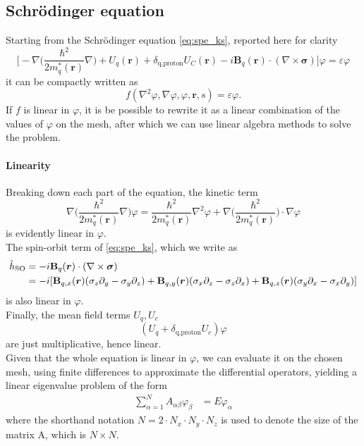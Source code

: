 \subsection{Schr\"odinger equation}
Starting from the Schr\"odinger equation \eqref{eq:spe_ks}, reported here for clarity
\begin{equation*}
    \bigg[-\nabla\bigg(\frac{\hbar^2}{2m^{*}_q(\mathbf r)}\nabla \bigg) + U_q(\mathbf r) + \delta_{\text{q,proton}}U_C(\mathbf r)-i\mathbf B_q(\mathbf r)\cdot(\nabla \times \boldsymbol\sigma) \bigg]\varphi=\varepsilon\varphi
\end{equation*}
it can be compactly written as
\begin{equation}
    \label{eq:pde} f(\nabla^2 \varphi, \nabla \varphi, \varphi, \bm r, s) = \varepsilon\varphi.
\end{equation}
If $f$ is linear in $\varphi$, it is be possible to rewrite it as a linear combination of the values of $\varphi$ on the mesh, after which we can use linear algebra methods to solve the problem.
\paragraph{Linearity}
Breaking down each part of the equation, the kinetic term
\begin{equation}
\label{eq:kin_lin_dim}
\nabla\bigg(\frac{\hbar^2}{2m^{*}_q(\mathbf r)}\nabla \bigg)\varphi = \frac{\hbar^2}{2m^{*}_q(\mathbf r)} \nabla^2\varphi + \nabla\bigg(\frac{\hbar^2}{2m^{*}_q(\mathbf r)}\bigg)\cdot \nabla\varphi
\end{equation}
is evidently linear in $\varphi$. 
\\The spin-orbit term of \eqref{eq:spe_ks}, which we write as
\begin{align*}
    \hat {{h}}_{\text{SO}}&=-i\mathbf B_q (\bm r )\cdot (\nabla \times \boldsymbol{\sigma} ) 
    \\&=-i[\mathbf B_{q,x}(\bm r)(\sigma_z\partial_y - \sigma_y\partial_z) + \mathbf B_{q,y}(\bm r)(\sigma_x\partial_z - \sigma_z\partial_x) + \mathbf B_{q,z}(\bm r)(\sigma_y\partial_x - \sigma_x\partial_y)]
\end{align*}
is also linear in $\varphi$.
\\Finally, the mean field terms $U_q, U_c$ 
\begin{equation*}
    (U_q + \delta_{\text{q,proton}}U_c)\varphi
\end{equation*}
are just multiplicative, hence linear.
\\Given that the whole equation is linear in $\varphi$, we can evaluate it on the chosen mesh, using finite differences to approximate the differential operators, yielding a linear eigenvalue problem of the form
\begin{align}
    \sum_{\alpha = 1}^{N} A_{\alpha\beta}\varphi_{\beta} &= E\varphi_\alpha
\end{align}
where the shorthand notation $N=2\cdot N_x\cdot N_y\cdot N_z$ is used to denote the size of the matrix A, which is $N\times N$.

